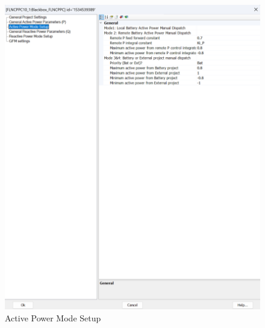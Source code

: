 \documentclass{../grid-link-report}
\begin{document}
		\begin{figure}[H]
		\centering
		\includegraphics[width=\textwidth]{report-assets/images/Active Power Mode Setup.png}
		\caption{Active Power Mode Setup}
		\label{fig:Active Power Mode Setup}
	\end{figure}
	
\end{document}
